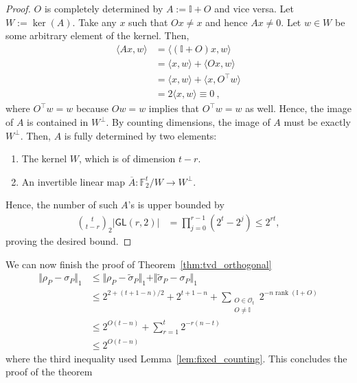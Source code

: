 \documentclass[11pt]{article}
\newcommand{\id}{\ensuremath{\mathbb{I}}}
\newcommand{\F}{\mathbb{F}}
\newcommand{\Oc}{\mathcal{O}}
\DeclareMathOperator{\rank}{rank}
\begin{document}
\begin{proof}
    $O$ is completely determined by $A:=\id+O$ and vice versa. Let $W := \ker(A)$. Take any $x$ such that $Ox \neq x$ and hence $Ax \neq 0$. Let $w \in W$ be some arbitrary element of the kernel. Then,
    \begin{align}
        \langle Ax,w \rangle & = \langle (\id + O)x, w\rangle \\
        & = \langle x , w \rangle  + \langle Ox, w\rangle\\
        & = \langle x,w\rangle + \langle x, O^\top w\rangle \\
        & = 2\langle x, w\rangle \equiv 0 \ ,
    \end{align}
    where $O^\top w = w$ because $Ow = w$ implies that $O^\top w = w$ as well. Hence, the image of $A$ is contained in $W^\perp$. By counting dimensions, the image of $A$ must be exactly $W^\perp$. Then, $A$ is fully determined by two elements:
    \begin{enumerate}
        \item The kernel $W$, which is of dimension $t-r$.
        \item An invertible linear map $\overline{A}:\F_2^t / W \rightarrow W^\perp$.
    \end{enumerate}
    Hence, the number of such $A$'s is upper bounded by
    \begin{align}
        \binom{t}{t-r}_2 \left\vert \mathsf{GL}(r,2)\right\vert & = \prod_{j=0}^{r-1}(2^t-2^j) \leq  2^{rt},
    \end{align}
    proving the desired bound.
\end{proof}

We can now finish the proof of Theorem~\ref{thm:tvd_orthogonal}
\begin{align}
        \Vert \rho_P - \sigma_P\Vert_1 & \leq \Vert \rho_P - \tilde{\sigma}_P\Vert_1 + \Vert \tilde{\sigma}_P - \sigma_P\Vert_1\\
        & \leq 2^{2+(t+1-n)/2} + 2^{t+1-n} + \sum_{\substack{O \in \Oc_t \\ O \neq \id}} 2^{-n\rank(\id+O)}\\
        &\leq 2^{O(t-n)}+\sum_{r=1}^t 2^{-r(n-t)}\\
        &\leq  2^{O(t-n)}
    \end{align}
where the third inequality used Lemma~\ref{lem:fixed_counting}. This concludes the proof of the theorem
\end{document}
